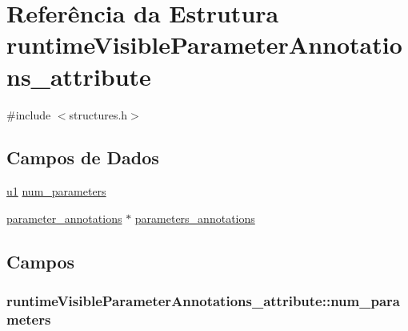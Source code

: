 \hypertarget{structruntimeVisibleParameterAnnotations__attribute}{}\section{Referência da Estrutura runtime\+Visible\+Parameter\+Annotations\+\_\+attribute}
\label{structruntimeVisibleParameterAnnotations__attribute}


{\ttfamily \#include $<$structures.\+h$>$}

\subsection*{Campos de Dados}
\begin{DoxyCompactItemize}
\item 
\hyperlink{lista__operandos_8h_ad9f4cdb6757615aae2fad89dab3c5470}{u1} \hyperlink{structruntimeVisibleParameterAnnotations__attribute_ae31e0bdeb2761d98c425ff91c84a5eea}{num\+\_\+parameters}
\item 
\hyperlink{structparameter__annotations}{parameter\+\_\+annotations} $\ast$ \hyperlink{structruntimeVisibleParameterAnnotations__attribute_a42e5e477f793842b0caeba7b32088740}{parameters\+\_\+annotations}
\end{DoxyCompactItemize}


\subsection{Campos}
\subsubsection[{\texorpdfstring{num\+\_\+parameters}{num_parameters}}]{ runtime\+Visible\+Parameter\+Annotations\+\_\+attribute\+::num\+\_\+parameters}\hypertarget{structruntimeVisibleParameterAnnotations__attribute_ae31e0bdeb2761d98c425ff91c84a5eea}{}\label{structruntimeVisibleParameterAnnotations__attribute_ae31e0bdeb2761d98c425ff91c84a5eea}
